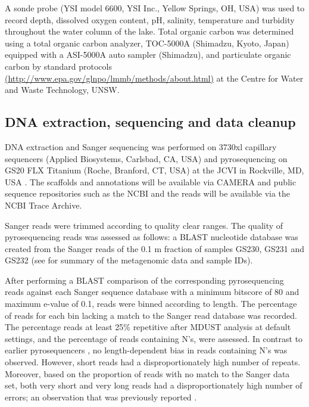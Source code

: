 A sonde probe (\textsc{YSI} model 6600, \textsc{YSI} Inc., Yellow Springs, \textsc{OH}, \textsc{USA}) was used to record depth, dissolved oxygen content, pH, salinity, temperature and turbidity throughout the water column of the lake. 
Total organic carbon was determined using a total organic carbon analyzer, TOC-5000A (Shimadzu, Kyoto, Japan) equipped with a \textsc{ASI}-5000A auto sampler (Shimadzu), and particulate organic carbon by standard protocols 
\url{(http://www.epa.gov/glnpo/lmmb/methods/about.html)} 
at the Centre for Water and Waste Technology, \textsc{UNSW}.

\subsection{\textsc{DNA} extraction, sequencing and data cleanup}
\textsc{DNA} extraction and Sanger sequencing was performed on 3730xl capillary sequencers (Applied Biosystems, Carlsbad, \textsc{CA}, \textsc{USA}) and pyrosequencing on \textsc{GS20 FLX} Titanium (Roche, Branford, \textsc{CT}, \textsc{USA}) at the \acl{JCVI} in Rockville, \textsc{MD}, \textsc{USA} \cite{Rusch2007}. 
The scaffolds and annotations will be available via \ac{CAMERA} and public sequence repositories such as the \ac{NCBI} and the reads will be available via the \ac{NCBI} Trace Archive. 

Sanger reads were trimmed according to quality clear ranges.
The quality of pyrosequencing reads was assessed as follows: 
a \ac{BLAST} nucleotide database was created from the Sanger reads of the 0.1 \textmu{}m fraction of samples GS230, GS231 and GS232 (see  for summary of the metagenomic data and sample IDs).

After performing a \ac{BLAST} comparison of the corresponding pyrosequencing reads against each Sanger sequence database with a minimum bitscore of 80 and maximum e-value of 0.1, reads were binned according to length.
The percentage of reads for each bin lacking a match to the Sanger read database was recorded. 
The percentage reads at least 25\% repetitive after \textsc{MDUST} \cite{Morgulis2006} analysis at default settings, and the percentage of reads containing N's, were assessed. 
In contrast to earlier pyrosequencers \cite{Huse2007}, no length-dependent bias in reads containing N's was observed. 
However, short reads had a disproportionately high number of repeats. 
Moreover, based on the proportion of reads with no match to the Sanger data set, both very short and very long reads had a disproportionately high number of errors; an observation that was previously reported \cite{Huse2007}.

